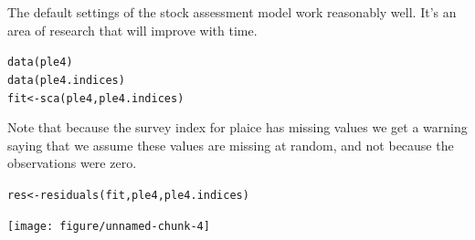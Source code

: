 \documentclass[a4paper,english,10pt]{article}\usepackage[]{graphicx}\usepackage[]{color}
\makeatletter
\newcommand{\hlstd}[1]{\textcolor[rgb]{0,0,0}{#1}}%
\newcommand{\hlkwb}[1]{\textcolor[rgb]{0.361,0.506,0.596}{#1}}%
\newcommand{\hlkwd}[1]{\textcolor[rgb]{0.361,0.506,0.596}{#1}}%
\newenvironment{kframe}{%
 \def\at@end@of@kframe{}%
 \ifinner\ifhmode%
  \def\at@end@of@kframe{\end{minipage}}%
  \begin{minipage}{\columnwidth}%
 \fi\fi%
 \def\FrameCommand##1{\hskip\@totalleftmargin \hskip-\fboxsep
 \colorbox{shadecolor}{##1}\hskip-\fboxsep
     \hskip-\linewidth \hskip-\@totalleftmargin \hskip\columnwidth}%
 \MakeFramed {\advance\hsize-\width
   \@totalleftmargin\z@ \linewidth\hsize
   \@setminipage}}%
 {\par\unskip\endMakeFramed%
 \at@end@of@kframe}
\newenvironment{knitrout}{}{} %
\makeatother
\begin{document}
The default settings of the stock assessment model work reasonably well. It's an area of research that will improve with time.

\begin{knitrout}
\color{fgcolor}\begin{kframe}
\begin{alltt}
\hlkwd{data}\hlstd{(ple4)}
\hlkwd{data}\hlstd{(ple4.indices)}
\hlstd{fit} \hlkwb{<-} \hlkwd{sca}\hlstd{(ple4, ple4.indices)}
\end{alltt}


{\ttfamily\noindent\itshape\color{messagecolor}{\#\# Note: The following observations are treated as being missing at random:\\\#\# 	\ \ \ \ \ \  fleet year age\\\#\# 	\ \ \ \ BTS-Isis 1997\ \  1\\\#\# 	\ \ \ \ BTS-Isis 1997\ \  2\\\#\# 	 BTS-Tridens 1997\ \  1\\\#\# 	 BTS-Tridens 1997\ \  2\\\#\# 	\ \ \ \ \ \ \ \  SNS 1997\ \  1\\\#\# 	\ \ \ \ \ \ \ \  SNS 1997\ \  2\\\#\# 	\ \ \ \ \ \ \ \  SNS 2003\ \  1\\\#\# 	\ \ \ \ \ \ \ \  SNS 2003\ \  2\\\#\# 	\ \ \ \ \ \ \ \  SNS 2003\ \  3\\\#\#\ \ \ \ \ \  Predictions will be made for missing observations.}}\end{kframe}
\end{knitrout}


Note that because the survey index for plaice has missing values we get a warning saying that we assume these values are missing at random, and not because the observations were zero.

\begin{knitrout}
\color{fgcolor}\begin{kframe}
\begin{alltt}
\hlstd{res} \hlkwb{<-} \hlkwd{residuals}\hlstd{(fit, ple4, ple4.indices)}
\end{alltt}
\end{kframe}
\end{knitrout}


\begin{knitrout}
\color{fgcolor}

{\centering \texttt{[image: figure/unnamed-chunk-4]} 

}



\end{knitrout}
\end{document}
